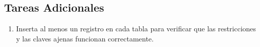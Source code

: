 \documentclass[a4paper,11pt]{article}
\begin{document}
\begin{Form}
\section{Tareas Adicionales}
\begin{enumerate}    
    \item Inserta al menos un registro en cada tabla para verificar que las restricciones y las claves ajenas funcionan correctamente.
\end{enumerate}

\end{Form}
\end{document}
